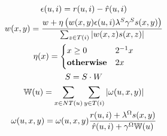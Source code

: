 \documentclass{article}
\begin{document}

\begin{gather}
\epsilon(u,i) = r(u,i) - \hat{r}(u,i) \\
w(x,y) = \frac{w + \eta \left(w(x,y) \epsilon(u,i) \lambda^{S} \gamma^{S} s(x,y)\right)}{\sum_{z \in T(i)} |w(x,z) s(x,z)|} \\
\eta (x) = \begin{cases}
x \geq 0 & 2^{-1}x \\
\textbf{\text{otherwise}} & 2x
\end{cases} \\
S = S \cdot W \\
\mathbb{W}(u) = \sum_{x \in NT(u)}\sum_{y \in T(i)} |\omega(u,x,y)| \\
\omega(u,x,y) = \omega(u,x,y) \frac{r(u,i) + \lambda^{\Omega}s(x,y)}{\hat{r}(u,i) + \gamma^{\Omega} \mathbb{W}(u)}
\end{gather}

% 
% 
%
\end{document}
